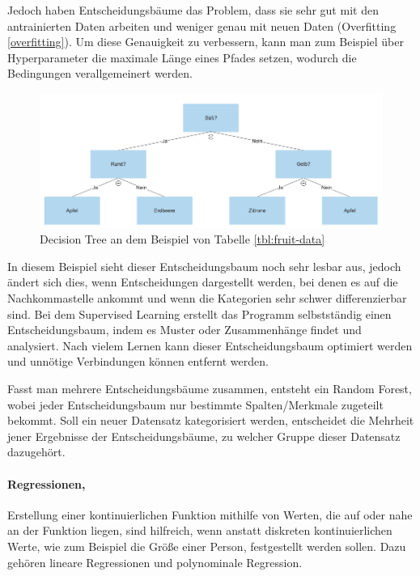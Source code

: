 Jedoch haben Entscheidungsbäume das Problem, dass sie sehr gut mit den antrainierten Daten arbeiten und weniger genau mit neuen Daten (Overfitting \ref{overfitting}). Um diese Genauigkeit zu verbessern, kann man zum Beispiel über Hyperparameter die maximale Länge eines Pfades setzen, wodurch die Bedingungen verallgemeinert werden.

\begin{figure}[H]
      \centering
      \includegraphics[scale=0.5]{sections/machine-learning/images/decision-tree.png}
      \caption{Decision Tree an dem Beispiel von Tabelle \ref{tbl:fruit-data}}
\end{figure}

In diesem Beispiel sieht dieser Entscheidungsbaum noch sehr lesbar aus, jedoch ändert sich dies, wenn Entscheidungen dargestellt werden, bei denen es auf die Nachkommastelle ankommt und wenn die Kategorien sehr schwer differenzierbar sind. Bei dem Supervised Learning erstellt das Programm selbstständig einen Entscheidungsbaum, indem es Muster oder Zusammenhänge findet und analysiert. Nach vielem Lernen kann dieser Entscheidungsbaum optimiert werden und unnötige Verbindungen können entfernt werden.

Fasst man mehrere Entscheidungsbäume zusammen, entsteht ein Random Forest, wobei jeder Entscheidungsbaum nur bestimmte Spalten/Merkmale zugeteilt bekommt. Soll ein neuer Datensatz kategorisiert werden, entscheidet die Mehrheit jener Ergebnisse der Entscheidungsbäume, zu welcher Gruppe dieser Datensatz dazugehört.

\paragraph{Regressionen,} Erstellung einer kontinuierlichen Funktion mithilfe von Werten, die auf oder nahe an der Funktion liegen, sind hilfreich, wenn anstatt diskreten kontinuierlichen Werte, wie zum Beispiel die Größe einer Person, festgestellt werden sollen. Dazu gehören lineare Regressionen und polynominale Regression.

